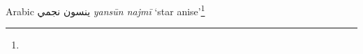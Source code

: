 \begin{etymology}\label{ety:yansun najmi}
Arabic {ينسون نجمي} \textit{yansūn najmī} `star anise'\footnote{}
\end{etymology}